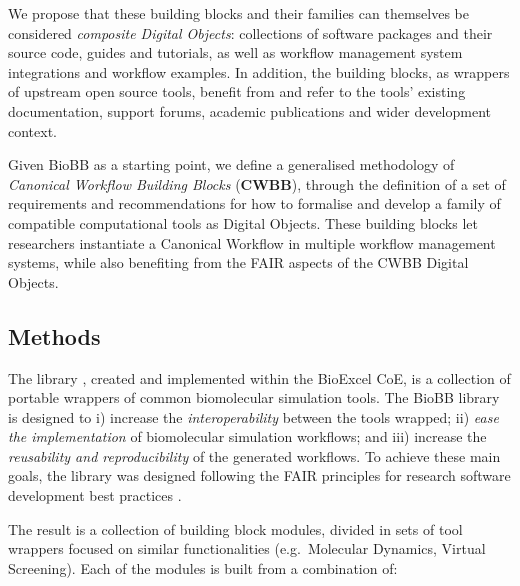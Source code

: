 We propose that these building blocks and their families can themselves be considered \emph{composite Digital Objects}: collections of software packages and their source code, guides and tutorials, as well as workflow management system integrations and workflow examples.
In addition, the building blocks, as wrappers of upstream open source tools, benefit from and refer to the tools' existing documentation, support forums, academic publications and wider development context.

Given BioBB as a starting point, we define a generalised methodology of \emph{Canonical Workflow Building Blocks} (\textbf{CWBB}), through the definition of a set of requirements and recommendations for how to formalise and develop a family of compatible computational tools as Digital Objects.
These building blocks let researchers instantiate a Canonical Workflow in multiple workflow management systems, while also benefiting from the FAIR aspects of the CWBB Digital Objects.

\subsection{Methods}\label{ch6:methods}

The  library \cite{Andrio 2019}, created and implemented within the BioExcel CoE, is a collection of portable wrappers of common biomolecular simulation tools.
The BioBB library is designed to i) increase the \emph{interoperability} between the tools wrapped; ii) \emph{ease the implementation} of biomolecular simulation workflows; and iii) increase the \emph{reusability and reproducibility} of the generated workflows.
To achieve these main goals, the library was designed following the FAIR principles for research software development best practices \cite{Lamprecht 2019}.

The result is a collection of building block modules, divided in sets of tool wrappers focused on similar functionalities (e.g.~Molecular Dynamics, Virtual Screening).
Each of the modules is built from a combination of:

